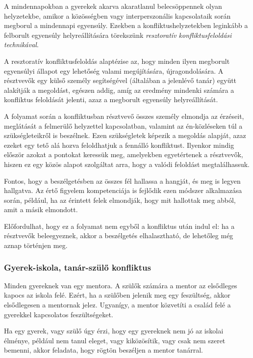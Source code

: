 A mindennapokban a gyerekek akarva akaratlanul belecsöppennek olyan hely\-ze\-tek\-be, amikor a közösségben vagy interperszonális kapcsolataik során megborul a mindennapi egyensúly. Ezekben a konfliktushelyzetekben leginkább a felborult egyensúly helyreállítására törekszünk \emph{resztoratív konfliktusfeloldási technikával}.

A resztoratív konfliktusfeloldás alaptézise az, hogy minden ilyen megborult egyensúlyi állapot egy lehetőség valami megújítására, újragondolására. A résztvevők egy külső személy segítségével (általában a jelenlévő tanár) együtt alakítják a megoldást, egészen addig, amíg az eredmény mindenki számára a konfliktus feloldását jelenti, azaz a megborult egyensúly helyreállítását.

A folyamat során a konfliktusban résztvevő összes személy elmondja az érzéseit, meglátását a felmerülő helyzettel kapcsolatban, valamint az én-közléseken túl a szükségleteikről is beszélnek. Ezen szükségletek képezik a megoldás alapját, azaz ezeket egy tető alá hozva feloldhatjuk a fennálló konfliktust. Ilyenkor mindig először azokat a pontokat keressük meg, amelyekben egyetértenek a résztvevők, hiszen ez egy közös alapot szolgáltat arra, hogy a valódi feloldást megtalálhassuk.

Fontos, hogy a beszélgetésben az összes fél hallassa a hangját, és meg is legyen hallgatva. Az értő figyelem kompetenciája is fejlődik ezen módszer alkalmazása során, például, ha az érintett felek elmondják, hogy mit hallottak meg abból, amit a másik elmondott.

Előfordulhat, hogy ez a folyamat nem egyből a konfliktus után indul el: ha a résztvevők beleegyeznek, akkor a beszélgetés elhalasztható, de lehetőleg még aznap történjen meg.

\subsubsection{Gyerek-iskola, tanár-szülő konfliktus}

Minden gyereknek van egy mentora. A szülők számára a mentor az elsődleges kapocs az iskola felé. Ezért, ha a szülőben jelenik meg egy feszültség, akkor elsődlegesen a mentornak jelez. Ugyanígy, a mentor közvetíti a család felé a gyerekkel kapcsolatos feszültségeket.

Ha egy gyerek, vagy szülő úgy érzi, hogy egy gyereknek nem jó az iskolai élménye, például nem tanul eleget, vagy kiközösítik, vagy csak nem szeret bemenni, akkor feladata, hogy rögtön beszéljen a mentor tanárral.

